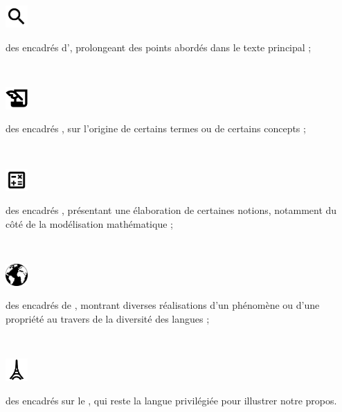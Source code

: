 \noindent\begin{minipage}[c]{24pt}
  {\includegraphics[width=24pt]{figures/tbls-glass.pdf}}\end{minipage}\hfill\begin{minipage}[c]{\textwidth - 36pt}des encadrés d’, prolongeant des points abordés dans le texte principal ;\end{minipage}\medskip\\
\noindent\begin{minipage}[c]{24pt}
  {\includegraphics[width=24pt]{figures/tbls-history.pdf}}\end{minipage}\hfill\begin{minipage}[c]{\textwidth - 36pt}des encadrés , sur l’origine de certains termes ou de certains concepts ;\end{minipage}\medskip\\
\noindent\begin{minipage}[c]{24pt}
  {\includegraphics[width=24pt]{figures/tbls-calc.pdf}}\end{minipage}\hfill\begin{minipage}[c]{\textwidth - 36pt}des encadrés , présentant une élaboration de certaines notions, notamment du côté de la modélisation mathématique ;\end{minipage}\medskip\\
\noindent\begin{minipage}[t]{24pt}
  {\includegraphics[width=24pt]{figures/tbls-world.pdf}}\end{minipage}\hfill\begin{minipage}[c]{\textwidth - 36pt}des encadrés de , montrant diverses réalisations d’un phénomène ou d’une propriété au travers de la diversité des langues ;\end{minipage}\medskip\\
\noindent\begin{minipage}[c]{24pt}
  {\includegraphics[width=24pt]{figures/tbls-french.pdf}}\end{minipage}\hfill\begin{minipage}[c]{\textwidth - 36pt}des encadrés sur le , qui reste la langue privilégiée pour illustrer notre propos.\end{minipage}
  
